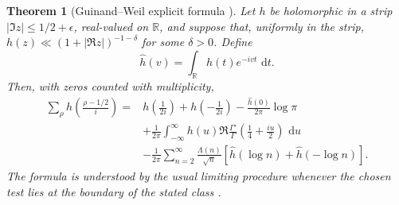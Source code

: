 \documentclass[11pt]{amsart}
\numberwithin{equation}{section}
\theoremstyle{plain}
\newtheorem{theorem}{Theorem}[section]
\theoremstyle{definition}
\theoremstyle{remark}
\newcommand{\1}{\mathbf{1}}
\newcommand{\dd}{\,\mathrm{d}}
\begin{document}
\begin{theorem}[Guinand--Weil explicit formula {}]
\label{thm:guinand_weil_normalized}
Let \(h\) be holomorphic in a strip
\(|\Im z|\leq1/2+\epsilon\), real-valued on \(\mathbb R\), and suppose
that, uniformly in the strip,
\(h(z)\ll(1+|\Re z|)^{-1-\delta}\) for some \(\delta>0\).  Define
\begin{equation}
\widehat h(v)
=
\int_{\mathbb R}h(t)e^{-ivt}\,\dd t.
\label{eq:guinand_fourier_convention}
\end{equation}
Then, with zeros counted with multiplicity,
\begin{align}
\sum_\rho
h\!\left(\frac{\rho-1/2}{i}\right)
={}&
h\!\left(\frac1{2i}\right)
+
h\!\left(-\frac1{2i}\right)
-
\frac{\widehat h(0)}{2\pi}\log\pi
\label{eq:guinand_archimedean_first}
\\
&+
\frac1{2\pi}
\int_{-\infty}^{\infty}
 h(u)
 \Re\frac{\Gamma'}{\Gamma}
 \!\left(\frac14+\frac{iu}{2}\right)
\,\dd u
\label{eq:guinand_archimedean_second}
\\
&-
\frac1{2\pi}
\sum_{n=2}^{\infty}
\frac{\Lambda(n)}{\sqrt n}
\left[
\widehat h(\log n)+\widehat h(-\log n)
\right].
\label{eq:guinand_prime_side}
\end{align}
The formula is understood by the usual limiting procedure whenever the
chosen test lies at the boundary of the stated class
\cite{Guinand1948,Weil1952}.
\end{theorem}
\end{document}
